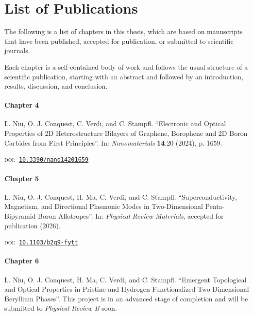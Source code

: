 \chapter*{List of Publications}

The following is a list of chapters in this thesis,
which are based on manuscripts that have been published,
accepted for publication,
or submitted to scientific journals.

Each chapter is a self-contained body of work and follows the usual structure of a scientific publication,
starting with an abstract and followed by an introduction, results, discussion, and conclusion.

\par\vspace{\baselineskip}

\subsubsection*{Chapter 4}

L. Niu, O. J. Conquest, C. Verdi, and C. Stampfl.
``Electronic and Optical Properties of 2D Heterostructure Bilayers of Graphene, Borophene and 2D Boron Carbides from First Principles''.
In: \textit{Nanomaterials} \textbf{14}.20 (2024), p. 1659.
\par\textsc{doi}:~\href{https://doi.org/10.3390/nano14201659}{\texttt{10.3390/nano14201659}}

\subsubsection*{Chapter 5}

L. Niu, O. J. Conquest, H. Ma, C. Verdi, and C. Stampfl.
``Superconductivity, Magnetism, and Directional Plasmonic Modes in Two-Dimensional Penta-Bipyramid Boron Allotropes''.
In: \textit{Physical Review Materials}, accepted for publication (2026).
\par\textsc{doi}:~\href{https://doi.org/10.1103/b2q9-fytt}{\texttt{10.1103/b2q9-fytt}}

\subsubsection*{Chapter 6}

L. Niu, O. J. Conquest, H. Ma, C. Verdi, and C. Stampfl.
``Emergent Topological and Optical Properties in Pristine and Hydrogen-Functionalized Two-Dimensional Beryllium Phases''.
This project is in an advanced stage of completion and will be submitted to \textit{Physical Review B} soon.

